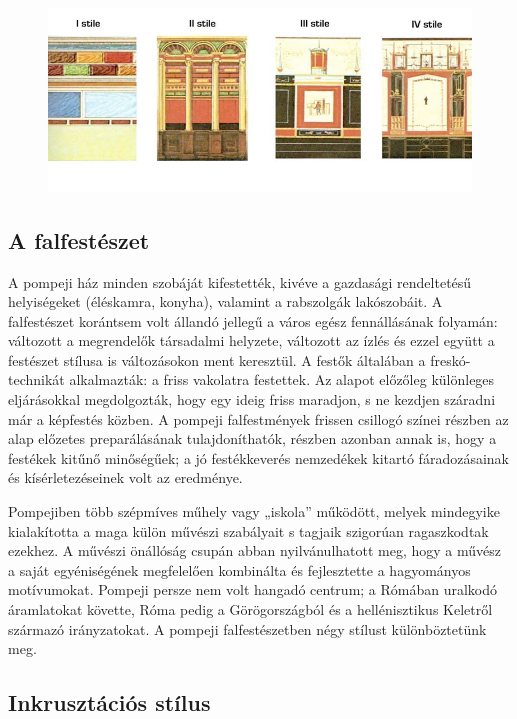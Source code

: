 \begin{figure}[H]
	\centering
	\includegraphics[width=1.0\linewidth]{"Pompeji 4 stilusa"}
\end{figure}


	\subsection{A falfestészet}
	
	A pompeji ház minden szobáját kifestették, kivéve a gazdasági rendeltetésű helyiségeket
	(éléskamra, konyha), valamint a rabszolgák lakószobáit. A falfestészet korántsem volt
	állandó jellegű a város egész fennállásának folyamán: változott a megrendelők társadalmi
	helyzete, változott az ízlés és ezzel együtt a festészet stílusa is változásokon ment
	keresztül. A festők általában a freskó-technikát alkalmazták: a friss vakolatra festettek.
	Az alapot előzőleg különleges eljárásokkal megdolgozták, hogy egy ideig friss maradjon,
	s ne kezdjen száradni már a képfestés közben. A pompeji falfestmények frissen csillogó
	színei részben az alap előzetes preparálásának tulajdoníthatók, részben azonban annak is,
	hogy a festékek kitűnő minőségűek; a jó festékkeverés nemzedékek kitartó
	fáradozásainak és kísérletezéseinek volt az eredménye.
	
	
	Pompejiben több szépmíves műhely vagy „iskola” működött, melyek mindegyike
	kialakította a maga külön művészi szabályait s tagjaik szigorúan ragaszkodtak ezekhez. A
	művészi önállóság csupán abban nyilvánulhatott meg, hogy a művész a saját
	egyéniségének megfelelően kombinálta és fejlesztette a hagyományos motívumokat. 
	Pompeji persze nem volt hangadó centrum; a Rómában uralkodó áramlatokat követte,
	Róma pedig a Görögországból és a hellénisztikus Keletről származó irányzatokat. A
	pompeji falfestészetben négy stílust különböztetünk meg.
	
	\subsection{Inkrusztációs stílus}
	
